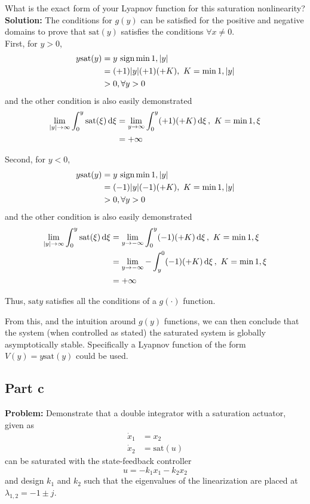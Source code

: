 \documentclass[letter]{article}
\newcommand{\sat}{\text{sat}}
\begin{document}
What is the exact form of your Lyapnov function for this saturation nonlinearity?\\

\noindent
\textbf{Solution:}
The conditions for $g(y)$ can be satisfied for the positive and negative domains to prove that $\text{sat}(y)$ satisfies the conditions $\forall x \neq 0$.\\

First, for $y > 0$,
\begin{align}
	y \sat(y) &= y \ \text{sign} \min{1,\abs{y}}\\
	&= (+1) \abs{y} (+1) (+K), \ K = \min{1,\abs{y}}\\
	&> 0, \forall y > 0
\end{align}
and the other condition is also easily demonstrated
\begin{align}
	\lim_{\abs{y} \to \infty} \int_0^y \sat(\xi) \dd{\xi} 
	&= \lim_{y \to \infty} \int_0^y (+1) (+ K) \dd{\xi}, \ K = \min{1,\xi}\\
	&= + \infty
\end{align}


Second, for $y < 0$,
\begin{align}
	y \sat(y) &= y \ \text{sign} \min{1,\abs{y}}\\
	&= (-1) \abs{y} (-1) (+K), \ K = \min{1,\abs{y}}\\
	&> 0, \forall y > 0
\end{align}
and the other condition is also easily demonstrated
\begin{align}
	\lim_{\abs{y} \to \infty} \int_0^y \sat(\xi) \dd{\xi} 
	&=\lim_{y \to - \infty} \int_0^y (-1) (+ K) \dd{\xi}, \ K = \min{1,\xi}\\
	&= \lim_{y \to - \infty} - \int_y^0 (-1) (+ K) \dd{\xi}, \ K = \min{1,\xi}\\
	&= + \infty
\end{align}

Thus, $\sat{y}$ satisfies all the conditions of a $g(\cdot)$ function.

From this, and the intuition around $g(y)$ functions, we can then conclude that the system (when controlled as stated) the saturated system is globally asymptotically stable. Specifically a Lyapnov function of the form $V(y) = y \sat(y)$ could be used.

\newpage
\subsection{Part c}
\textbf{Problem:}
Demonstrate that a double integrator with a saturation actuator, given as
\begin{equation}
	\begin{aligned}
		\dot{x}_1 &= x_2\\
		\dot{x}_2 &= \text{sat}(u)
	\end{aligned}
\end{equation}
can be saturated with the state-feedback controller $$ u = -k_1 x_1 - k_2 x_2$$ and design $k_1$ and $k_2$ such that the eigenvalues of the linearization are placed at $\lambda_{1,2} = -1 \pm j$.
\end{document}

